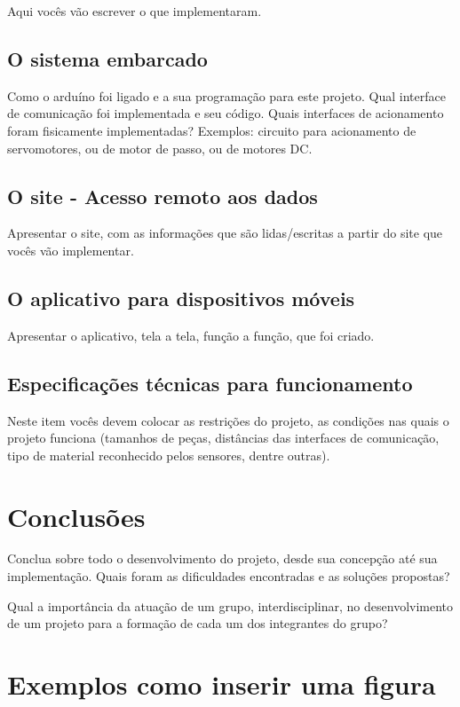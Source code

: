 \documentclass[10pt]{article}
\begin{document}
Aqui vocês vão escrever o que implementaram.

\subsection{O sistema embarcado}

Como o arduíno foi ligado e a sua programação para este projeto.
Qual interface de comunicação foi implementada e seu código.
Quais interfaces de acionamento foram fisicamente implementadas? Exemplos: circuito para acionamento de servomotores, ou de motor de passo, ou de motores DC.

\subsection{O site - Acesso remoto aos dados}

Apresentar o site, com as informações que são lidas/escritas a partir do site que vocês vão implementar.

\subsection{O aplicativo para dispositivos móveis}

Apresentar o aplicativo, tela a tela, função a função, que foi criado.

\subsection{Especificações técnicas para funcionamento}

Neste item vocês devem colocar as restrições do projeto, as condições nas quais o projeto funciona (tamanhos de peças, distâncias das interfaces de comunicação, tipo de material reconhecido pelos sensores, dentre outras).

\section{Conclusões}

Conclua sobre todo o desenvolvimento do projeto, desde sua concepção até sua implementação. Quais foram as dificuldades encontradas e as soluções propostas?

Qual a importância da atuação de um grupo, interdisciplinar, no desenvolvimento de um projeto para a formação de cada um dos integrantes do grupo?

\section{Exemplos como inserir uma figura}
\end{document}
